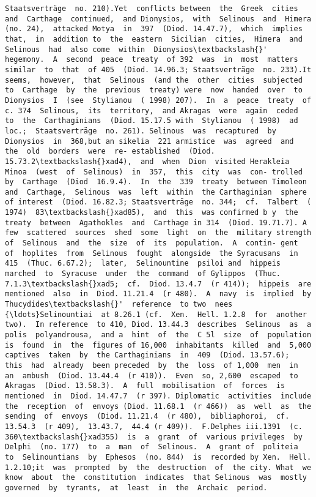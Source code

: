 \documentclass[11pt]{article}
\begin{document}
\begin{Verbatim}[commandchars=\\\{\}]
Staatsverträge  no. 210).Yet  conflicts between  the  Greek  cities  and  Carthage  continued,  and Dionysios,  with  Selinous  and  Himera  (no. 24),  attacked Motya  in  397  (Diod. 14.47.7),  which  implies  that,  in  addition to  the  eastern  Sicilian  cities,  Himera  and  Selinous  had  also come  within  Dionysios\textbackslash{}'  hegemony.  A  second  peace  treaty  of 392  was  in  most  matters  similar  to  that  of 405  (Diod. 14.96.3; Staatsverträge  no. 233).It  seems,  however,  that  Selinous  (and the  other  cities  subjected  to  Carthage  by  the  previous  treaty) were  now  handed  over  to  Dionysios  I  (see  Stylianou  ( 1998) 207).  In  a  peace  treaty  of  c. 374  Selinous,  its  territory,  and Akragas  were  again  ceded  to  the  Carthaginians  (Diod. 15.17.5 with  Stylianou  ( 1998)  ad  loc.;  Staatsverträge  no. 261). Selinous  was  recaptured  by  Dionysios  in  368,but an sikelia  221 armistice  was  agreed  and  the  old  borders  were  re- established  (Diod. 15.73.2\textbackslash{}xad4),  and  when  Dion  visited Herakleia  Minoa  (west  of  Selinous)  in  357,  this  city  was  con- trolled  by  Carthage  (Diod  16.9.4).  In  the  339  treaty  between Timoleon  and  Carthage,  Selinous  was  left  within  the Carthaginian  sphere  of interest  (Diod. 16.82.3; Staatsverträge  no. 344;  cf.  Talbert  ( 1974)  83\textbackslash{}xad85),  and  this  was confirmed b y  the  treaty  between  Agathokles  and  Carthage in 314  (Diod. 19.71.7). A  few  scattered  sources  shed  some  light  on  the  military strength  of  Selinous  and  the  size  of  its  population.  A  contin- gent  of  hoplites  from  Selinous  fought  alongside  the Syracusans  in  415  (Thuc. 6.67.2);  later,  Selinountine  psiloi and  hippeis  marched  to  Syracuse  under  the  command  of Gylippos  (Thuc. 7.1.3\textbackslash{}xad5;  cf.  Diod. 13.4.7  (r 414));  hippeis  are mentioned  also  in  Diod. 11.21.4  (r 480).  A  navy  is  implied  by Thucydides\textbackslash{}'  reference  to two  nees  {\ldots}Selinountiai  at 8.26.1 (cf.  Xen.  Hell. 1.2.8  for  another  two).  In reference  to 410, Diod. 13.44.3  describes  Selinous  as  a  polis  polyandrousa,  and a  hint  of  the  C 5l  size  of  population  is  found  in  the  figures of 16,000  inhabitants  killed  and  5,000  captives  taken  by  the Carthaginians  in  409  (Diod. 13.57.6);  this  had  already  been preceded  by  the  loss  of 1,000  men  in  an  ambush  (Diod. 13.44.4  (r 410)).  Even  so, 2,600  escaped  to Akragas  (Diod. 13.58.3).  A  full  mobilisation  of  forces  is  mentioned  in  Diod. 14.47.7  (r 397). Diplomatic  activities  include  the  reception  of  envoys (Diod. 11.68.1  (r 466))  as  well  as  the  sending  of  envoys  (Diod. 11.21.4  (r 480),  bibliaphoroi,  cf. 13.54.3  (r 409),  13.43.7,  44.4 (r 409)).  F.Delphes iii.1391  (c. 360\textbackslash{}xad355)  is  a  grant  of  various privileges  by  Delphi  (no. 177)  to  a  man  of  Selinous.  A  grant of  politeia  to  Selinountians  by  Ephesos  (no. 844)  is  recorded by Xen.  Hell. 1.2.10;it  was  prompted  by  the  destruction  of  the city. What  we  know  about  the  constitution  indicates  that Selinous  was  mostly  governed  by  tyrants,  at  least  in  the  Archaic  period.  
\end{Verbatim}
\end{document}
